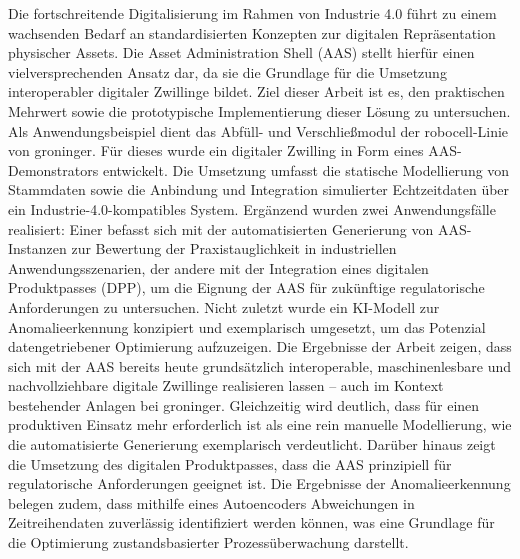 %
Die fortschreitende Digitalisierung im Rahmen von Industrie 4.0 führt zu einem wachsenden Bedarf an standardisierten Konzepten zur digitalen Repräsentation physischer Assets. Die Asset Administration Shell (AAS) stellt hierfür einen vielversprechenden Ansatz dar, da sie die Grundlage für die Umsetzung interoperabler digitaler Zwillinge bildet. Ziel dieser Arbeit ist es, den praktischen Mehrwert sowie die prototypische Implementierung dieser Lösung zu untersuchen. Als Anwendungsbeispiel dient das Abfüll- und Verschließmodul der robocell-Linie von groninger. Für dieses wurde ein digitaler Zwilling in Form eines AAS-Demonstrators entwickelt. Die Umsetzung umfasst die statische Modellierung von Stammdaten sowie die Anbindung und Integration simulierter Echtzeitdaten über ein Industrie-4.0-kompatibles System. Ergänzend wurden zwei Anwendungsfälle realisiert: Einer befasst sich mit der automatisierten Generierung von AAS-Instanzen zur Bewertung der Praxistauglichkeit in industriellen Anwendungsszenarien, der andere mit der Integration eines digitalen Produktpasses (DPP), um die Eignung der AAS für zukünftige regulatorische Anforderungen zu untersuchen. Nicht zuletzt wurde ein KI-Modell zur Anomalieerkennung konzipiert und exemplarisch umgesetzt, um das Potenzial datengetriebener Optimierung aufzuzeigen. Die Ergebnisse der Arbeit zeigen, dass sich mit der AAS bereits heute grundsätzlich interoperable, maschinenlesbare und nachvollziehbare digitale Zwillinge realisieren lassen – auch im Kontext bestehender Anlagen bei groninger. Gleichzeitig wird deutlich, dass für einen produktiven Einsatz mehr erforderlich ist als eine rein manuelle Modellierung, wie die automatisierte Generierung exemplarisch verdeutlicht. Darüber hinaus zeigt die Umsetzung des digitalen Produktpasses, dass die AAS prinzipiell für regulatorische Anforderungen geeignet ist. Die Ergebnisse der Anomalieerkennung belegen zudem, dass mithilfe eines Autoencoders Abweichungen in Zeitreihendaten zuverlässig identifiziert werden können, was eine Grundlage für die Optimierung zustandsbasierter Prozessüberwachung darstellt.
%
